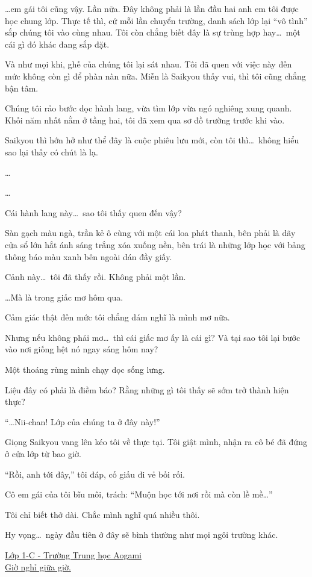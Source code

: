 \documentclass[../main.tex]{subfiles}
\begin{document}
\dots em gái tôi cũng vậy. Lần nữa. Đây không phải là lần đầu hai anh em tôi được học chung lớp. Thực tế thì, cứ mỗi lần chuyển trường, danh sách lớp lại ``vô tình'' sắp chúng tôi vào cùng nhau. Tôi còn chẳng biết đây là sự trùng hợp hay\dots\ một cái gì đó khác đang sắp đặt.

Và như mọi khi, ghế của chúng tôi lại sát nhau. Tôi đã quen với việc này đến mức không còn gì để phàn nàn nữa. Miễn là Saikyou thấy vui, thì tôi cũng chẳng bận tâm.

Chúng tôi rảo bước dọc hành lang, vừa tìm lớp vừa ngó nghiêng xung quanh. Khối năm nhất nằm ở tầng hai, tôi đã xem qua sơ đồ trường trước khi vào.

Saikyou thì hớn hở như thể đây là cuộc phiêu lưu mới, còn tôi thì\dots\ không hiểu sao lại thấy có chút là lạ.

\dots

\dots

Cái hành lang này\dots\ sao tôi thấy quen đến vậy?

Sàn gạch màu ngà, trần kẻ ô cùng với một cái loa phát thanh, bên phải là dãy cửa sổ lớn hắt ánh sáng trắng xóa xuống nền, bên trái là những lớp học với bảng thông báo màu xanh bên ngoài dán đầy giấy.

Cảnh này\dots\ tôi đã thấy rồi. Không phải một lần.

\dots Mà là trong giấc mơ hôm qua.

Cảm giác thật đến mức tôi chẳng dám nghĩ là mình mơ nữa.

Nhưng nếu không phải mơ\dots\ thì cái giấc mơ ấy là cái gì? Và tại sao tôi lại bước vào nơi giống hệt nó ngay sáng hôm nay?

Một thoáng rùng mình chạy dọc sống lưng.

Liệu đây có phải là điềm báo? Rằng những gì tôi thấy sẽ sớm trở thành hiện thực?

``\dots Nii-chan! Lớp của chúng ta ở đây này!''

Giọng Saikyou vang lên kéo tôi về thực tại. Tôi giật mình, nhận ra cô bé đã đứng ở cửa lớp từ bao giờ.

``Rồi, anh tới đây,'' tôi đáp, cố giấu đi vẻ bối rối.

Cô em gái của tôi bĩu môi, trách: ``Muộn học tới nơi rồi mà còn lề mề\dots''

Tôi chỉ biết thở dài. Chắc mình nghĩ quá nhiều thôi.

Hy vọng\dots\ ngày đầu tiên ở đây sẽ bình thường như mọi ngôi trường khác.

\begin{center}
  \uline{Lớp 1-C - Trường Trung học Aogami\\Giờ nghỉ giữa giờ.}
\end{center}
\end{document}

